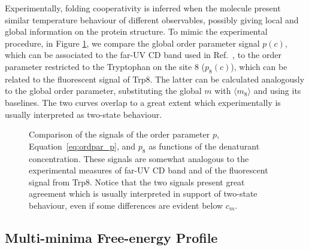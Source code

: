 Experimentally, folding cooperativity is inferred when the molecule present
similar temperature behaviour of different observables, possibly giving local
and global information on the protein structure.
To mimic the experimental procedure, in Figure \ref{fig:SI_p+W8}, we compare the
global order parameter signal $p(c)$, which can be associated to the far-UV CD band
used in Ref.~\cite{Mosavi2002a,Lowe2007a}, to the order parameter restricted to
the Tryptophan on the site 8 ($p_8(c)$), which can be related to the fluorescent
signal of Trp8.
The latter can be calculated analogously  to the global order parameter, substituting the
global $m$ with $\langle m_8\rangle$ and using its baselines.
The two curves overlap to a great extent which experimentally is usually
interpreted as two-state behaviour. 
\begin{figure}
\centering
\resizebox{0.6\textwidth}{!}{\sffamily}
\caption{Comparison of the signals of the order parameter $p$,
Equation~\ref{eq:ordpar_p}, and $p_8$ as functions of the denaturant concentration. 
These signals are somewhat analogous to the experimental measures of far-UV CD
band and of the fluorescent signal from Trp8.
Notice that the two signals present great agreement which is usually interpreted
in support of two-state behaviour, even if
some differences are evident below $c_m$.}
\label{fig:SI_p+W8}
\end{figure}


\subsection{Multi-minima Free-energy Profile}
\label{subsec:prof}

